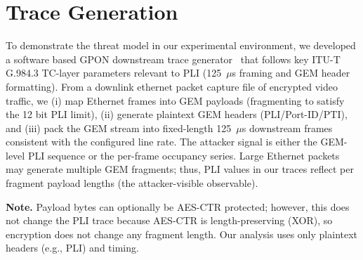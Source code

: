 \documentclass[conference]{IEEEtran}
\begin{document}
\section{Trace Generation}
To demonstrate the threat model in our experimental environment, we developed a software based GPON downstream trace generator~\cite{github} that follows key ITU-T G.984.3 TC-layer parameters relevant to PLI (125~$\mu$s framing and GEM header formatting). From a downlink ethernet packet capture file of encrypted video traffic, we (i) map Ethernet frames into GEM payloads (fragmenting to satisfy the 12 bit PLI limit), (ii) generate plaintext GEM headers (PLI/Port-ID/PTI), and (iii) pack the GEM stream into fixed-length 125~$\mu$s downstream frames consistent with the configured line rate. The attacker signal is either the GEM-level PLI sequence or the per-frame occupancy series. Large Ethernet packets may generate multiple GEM fragments; thus, PLI values in our traces reflect per fragment payload lengths (the attacker-visible observable).

\textbf{Note.} Payload bytes can optionally be AES-CTR protected; however, this does not change the PLI trace because AES-CTR is length-preserving (XOR), so encryption does not change any fragment length. Our analysis uses only plaintext headers (e.g., PLI) and timing.
\end{document}
